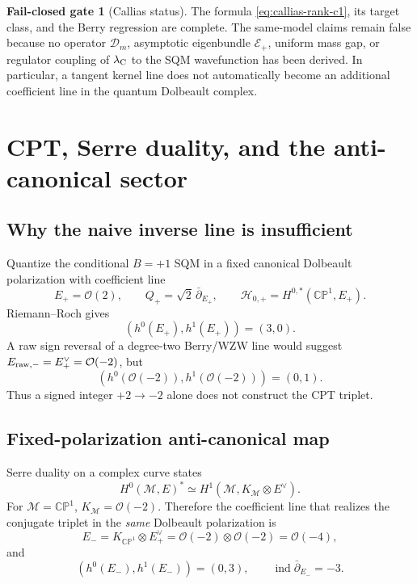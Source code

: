 \documentclass[11pt]{article}
\theoremstyle{definition}
\newtheorem{gate}[theorem]{Fail-closed gate}
\theoremstyle{remark}
\newcommand{\CP}{\mathbb {CP}}
\newcommand{\cO}{\mathcal O}
\newcommand{\cM}{\mathcal M}
\newcommand{\cE}{\mathcal E}
\newcommand{\cH}{\mathcal H}
\begin{document}
\begin{gate}[Callias status]
The formula \eqref{eq:callias-rank-c1}, its target class, and the Berry
regression are complete.  The same-model claims remain false because no
operator \(\mathscr D_m\), asymptotic eigenbundle \(\cE_+\), uniform mass gap,
or regulator coupling of \(\lambda_{\rm C}\) to the SQM wavefunction has been
derived.  In particular, a tangent kernel line does not automatically become
an additional coefficient line in the quantum Dolbeault complex.
\end{gate}

\section{CPT, Serre duality, and the anti-canonical sector}

\subsection{Why the naive inverse line is insufficient}

Quantize the conditional \(B=+1\) SQM in a fixed canonical Dolbeault
polarization with coefficient line
\begin{equation}
 E_+=\cO(2),
 \qquad
 Q_+=\sqrt2\,\bar\partial_{E_+},
 \qquad
 \cH_{0,+}=H^{0,*}(\CP^1,E_+).
 \label{eq:plus-polarization}
\end{equation}
Riemann--Roch gives
\begin{equation}
 (h^0(E_+),h^1(E_+))=(3,0).
 \label{eq:plus-count}
\end{equation}
A raw sign reversal of a degree-two Berry/WZW line would suggest
\(E_{\rm raw,-}=E_+^\vee=\cO(-2)\), but
\begin{equation}
 (h^0(\cO(-2)),h^1(\cO(-2)))=(0,1).
 \label{eq:naive-minus}
\end{equation}
Thus a signed integer \(+2\to-2\) alone does not construct the CPT triplet.

\subsection{Fixed-polarization anti-canonical map}

Serre duality on a complex curve states
\begin{equation}
 H^0(\cM,E)^*\simeq H^1(\cM,K_{\cM}\otimes E^\vee).
 \label{eq:serre-duality}
\end{equation}
For \(\cM=\CP^1\), \(K_{\cM}=\cO(-2)\).  Therefore the coefficient line that
realizes the conjugate triplet in the \emph{same} Dolbeault polarization is
\begin{equation}
 E_-=K_{\CP^1}\otimes E_+^\vee
 =\cO(-2)\otimes\cO(-2)=\cO(-4),
 \label{eq:anti-canonical-line}
\end{equation}
and
\begin{equation}
 (h^0(E_-),h^1(E_-))=(0,3),
 \qquad \operatorname{ind}\bar\partial_{E_-}=-3.
 \label{eq:minus-count}
\end{equation}
\end{document}
